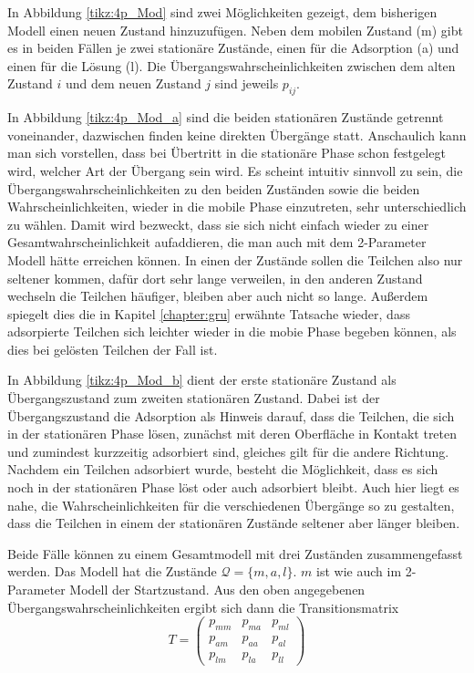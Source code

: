 In Abbildung \ref{tikz:4p_Mod} sind zwei Möglichkeiten gezeigt, dem bisherigen Modell einen neuen Zustand hinzuzufügen.
Neben dem mobilen Zustand (m) gibt es in beiden Fällen je zwei stationäre Zustände, einen für die Adsorption (a) und einen für die Lösung (l). Die Übergangswahrscheinlichkeiten zwischen dem alten Zustand $i$ und dem neuen Zustand $j$ sind jeweils $p_{ij}$. 

In Abbildung \ref{tikz:4p_Mod_a} sind die beiden stationären Zustände getrennt voneinander, dazwischen finden keine direkten Übergänge statt. 
Anschaulich kann man sich vorstellen, dass bei Übertritt in die stationäre Phase schon festgelegt wird, welcher Art der Übergang sein wird. Es scheint intuitiv sinnvoll zu sein, die Übergangswahrscheinlichkeiten zu den beiden Zuständen sowie die beiden Wahrscheinlichkeiten, wieder in die mobile Phase einzutreten, sehr unterschiedlich zu wählen. Damit wird bezweckt, dass sie sich nicht einfach wieder zu einer Gesamtwahrscheinlichkeit aufaddieren, die man auch mit dem 2-Parameter Modell hätte erreichen können. In einen der Zustände sollen die Teilchen also nur seltener kommen, dafür dort sehr lange verweilen,  in den anderen Zustand wechseln die Teilchen häufiger, bleiben aber auch nicht so lange. Außerdem spiegelt dies die in Kapitel \ref{chapter:gru} erwähnte Tatsache wieder, dass adsorpierte Teilchen sich leichter wieder in die mobie Phase begeben können, als dies bei gelösten Teilchen der Fall ist.

In Abbildung \ref{tikz:4p_Mod_b} dient der erste stationäre Zustand als Übergangszustand zum zweiten stationären Zustand. Dabei ist der Übergangszustand die Adsorption als Hinweis darauf, dass die Teilchen, die sich in der stationären Phase lösen, zunächst mit deren Oberfläche in Kontakt treten und zumindest kurzzeitig adsorbiert sind, gleiches gilt für die andere Richtung. Nachdem ein Teilchen adsorbiert wurde, besteht die Möglichkeit, dass es sich noch in der stationären Phase löst oder auch adsorbiert bleibt. Auch hier liegt es nahe, die Wahrscheinlichkeiten für die verschiedenen Übergänge so zu gestalten, dass die Teilchen in einem der stationären Zustände seltener aber länger bleiben.

Beide Fälle können zu einem Gesamtmodell mit drei Zuständen zusammengefasst werden. Das Modell hat die Zustände $\mathcal{Q} = \{m, a, l\}$. $m$ ist wie auch im 2-Parameter Modell der Startzustand. Aus den oben angegebenen Übergangswahrscheinlichkeiten ergibt sich dann die Transitionsmatrix 
\begin{equation}
T= 
\begin{pmatrix}
p_{mm} &  p_{ma} & p_{ml} \\
p_{am} &  p_{aa} & p_{al} \\
p_{lm} &  p_{la} & p_{ll} 
\end{pmatrix}
\label{3s_Transit}
\end{equation}
  

